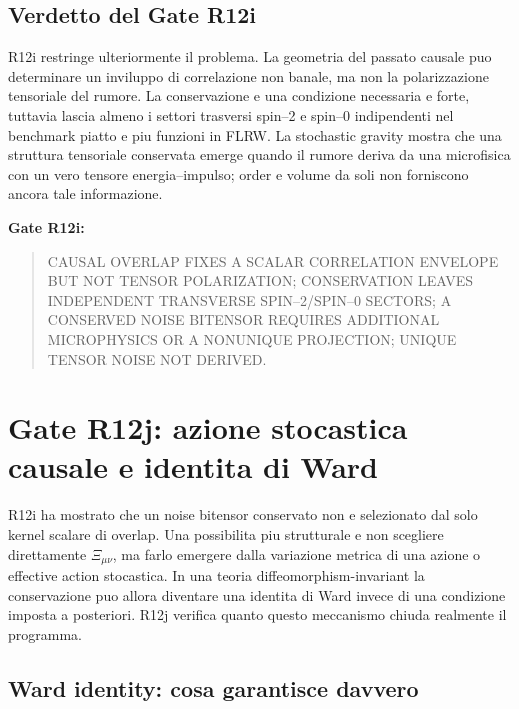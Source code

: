 \documentclass[11pt,a4paper]{article}
\begin{document}
\subsection{Verdetto del Gate R12i}

R12i restringe ulteriormente il problema. La geometria del passato causale puo determinare un inviluppo di correlazione non banale, ma non la polarizzazione tensoriale del rumore. La conservazione e una condizione necessaria e forte, tuttavia lascia almeno i settori trasversi spin--2 e spin--0 indipendenti nel benchmark piatto e piu funzioni in FLRW. La stochastic gravity mostra che una struttura tensoriale conservata emerge quando il rumore deriva da una microfisica con un vero tensore energia--impulso; order e volume da soli non forniscono ancora tale informazione.

\textbf{Gate R12i:}
\begin{quote}\small\textsf{CAUSAL OVERLAP FIXES A SCALAR CORRELATION ENVELOPE BUT NOT TENSOR POLARIZATION; CONSERVATION LEAVES INDEPENDENT TRANSVERSE SPIN--2/SPIN--0 SECTORS; A CONSERVED NOISE BITENSOR REQUIRES ADDITIONAL MICROPHYSICS OR A NONUNIQUE PROJECTION; UNIQUE TENSOR NOISE NOT DERIVED}.\end{quote}


\section{Gate R12j: azione stocastica causale e identita di Ward}

R12i ha mostrato che un noise bitensor conservato non e selezionato dal solo kernel scalare di overlap. Una possibilita piu strutturale e non scegliere direttamente $\Xi_{\mu\nu}$, ma farlo emergere dalla variazione metrica di una azione o effective action stocastica. In una teoria diffeomorphism-invariant la conservazione puo allora diventare una identita di Ward invece di una condizione imposta a posteriori. R12j verifica quanto questo meccanismo chiuda realmente il programma.

\subsection{Ward identity: cosa garantisce davvero}
\end{document}
